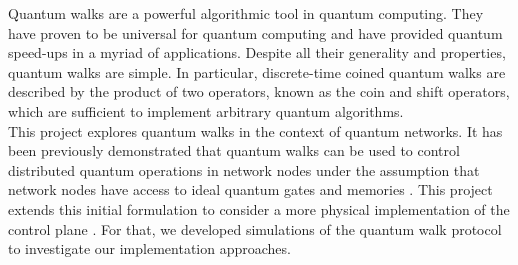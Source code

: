 \documentclass{article}
\begin{document}
    Quantum walks are a powerful algorithmic tool in quantum computing. They have proven to be universal for quantum computing and have provided quantum speed-ups in a myriad of applications. Despite all their generality and properties, quantum walks are simple. In particular, discrete-time coined quantum walks are described by the product of two operators, known as the coin and shift operators, which are sufficient to implement arbitrary quantum algorithms.\\
    This project explores quantum walks in the context of quantum networks. It has been previously demonstrated that quantum walks can be used to control distributed quantum operations in network nodes under the assumption that network nodes have access to ideal quantum gates and memories \cite{controlplane}. This project extends this initial formulation to consider a more physical implementation of the control plane \cite{universalcontrolplane}. For that, we developed simulations of the quantum walk protocol to investigate our implementation approaches.\\


    

    
        
        
        
        
\end{document}

